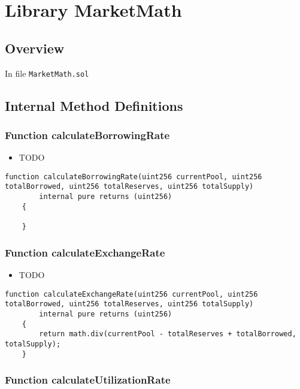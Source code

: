 
\chapter{Library MarketMath}

\minitoc

\section{Overview}


In file {\tt MarketMath.sol}

\section{Internal Method Definitions}


\subsection{Function calculateBorrowingRate}

\noindent\begin{itemize}
\item TODO
\end{itemize}

\begin{lstlisting}[firstnumber=8]
    function calculateBorrowingRate(uint256 currentPool, uint256 totalBorrowed, uint256 totalReserves, uint256 totalSupply) 
        internal pure returns (uint256) 
    {

    }
\end{lstlisting}

\subsection{Function calculateExchangeRate}

\noindent\begin{itemize}
\item TODO
\end{itemize}

\begin{lstlisting}[firstnumber=14]
    function calculateExchangeRate(uint256 currentPool, uint256 totalBorrowed, uint256 totalReserves, uint256 totalSupply)
        internal pure returns (uint256) 
    {
        return math.div(currentPool - totalReserves + totalBorrowed, totalSupply);
    }
\end{lstlisting}

\subsection{Function calculateUtilizationRate}

